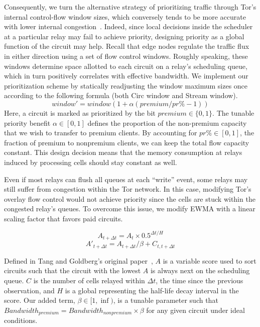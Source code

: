 Consequently, we turn the alternative strategy of prioritizing traffic through Tor's internal control-flow window sizes, which conversely tends to be more accurate with lower internal congestion~\cite{archive-2009-mail, kiraly2008solving}.
Indeed, since local decisions inside the scheduler at a particular relay may fail to achieve priority, designing priority as a global function of the circuit may help.
Recall that edge nodes regulate the traffic flux in either direction using a set of flow control windows.
Roughly speaking, these windows determine space allotted to each circuit on a relay's scheduling queue, which in turn positively correlates with effective bandwidth.
We implement our prioritization scheme by statically readjusting the window maximum sizes once according to the following formula (both Circ window and Stream window).
\begin{equation} window' = window(1+ \alpha(premium / pr\% - 1)) \label{eq:flow} \end{equation} Here, a circuit is marked as prioritized by the bit $premium \in \{0, 1\}$.
The tunable priority benefit $\alpha \in [0, 1]$ defines the proportion of the non-premium capacity that we wish to transfer to premium clients.
By accounting for $pr\% \in [0,1]$, the fraction of premium to nonpremium clients, we can keep the total flow capacity constant.
This design decision means that the memory consumption at relays induced by processing cells should stay constant as well.

Even if most relays can flush all queues at each ``write'' event, some relays may still suffer from congestion within the Tor network.
In this case, modifying Tor's overlay flow control would not achieve priority since the cells are stuck within the congested relay's queues.
To overcome this issue, we modify EWMA with a linear scaling factor that favors paid circuits.

\begin{equation}
  A_{t + \Delta t} = A_t \times 0.5^{\Delta t/H}
\end{equation}
\begin{equation}
  A'_{t + \Delta t} = A_{t + \Delta t} / \beta + C_{t, t + \Delta t}
\end{equation}

Defined in Tang and Goldberg's original paper~\cite{tang2010improved}, $A$ is a variable score used to sort circuits such that the circuit with the lowest $A$ is always next on the scheduling queue.
$C$ is the number of cells relayed within $\Delta t$, the time since the previous observation, and $H$ is a global representing the half-life decay interval in the score.
Our added term, $\beta \in [1, \inf)$, is a tunable parameter such that $\mathit{Bandwidth}_{\mathit{premium}} = \mathit{Bandwidth}_{\mathit{nonpremium}} \times \beta$ for any given circuit under ideal conditions.

